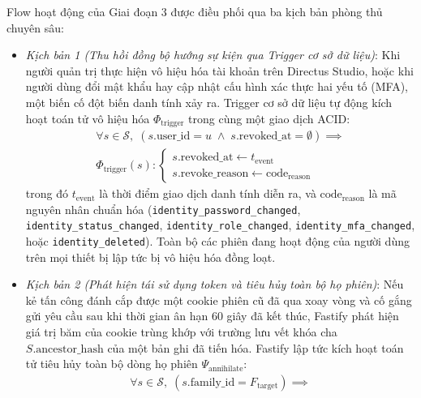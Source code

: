 Flow hoạt động của Giai đoạn 3 được điều phối qua ba kịch bản phòng thủ chuyên sâu:
\begin{itemize}
    \item[-] \textit{Kịch bản 1 (Thu hồi đồng bộ hướng sự kiện qua Trigger cơ sở dữ liệu)}: Khi người quản trị thực hiện vô hiệu hóa tài khoản trên Directus Studio, hoặc khi người dùng đổi mật khẩu hay cập nhật cấu hình xác thực hai yếu tố (MFA), một biến cố đột biến danh tính xảy ra. Trigger cơ sở dữ liệu tự động kích hoạt toán tử vô hiệu hóa $\Phi_{\text{trigger}}$ trong cùng một giao dịch ACID:
    \begin{equation}
    \label{eq:trigger_revoke_vi}
    \begin{aligned}
    \forall s \in \mathcal{S}, \; (s.\text{user\_id} = u \;\wedge\; s.\text{revoked\_at} = \emptyset) \implies \\
    \Phi_{\text{trigger}}(s) : \begin{cases}
    s.\text{revoked\_at} \leftarrow t_{\text{event}} \\
    s.\text{revoke\_reason} \leftarrow \text{code}_{\text{reason}}
    \end{cases}
    \end{aligned}
    \end{equation}
    trong đó $t_{\text{event}}$ là thời điểm giao dịch danh tính diễn ra, và $\text{code}_{\text{reason}}$ là mã nguyên nhân chuẩn hóa (\texttt{identity\_}\allowbreak\texttt{password\_}\allowbreak\texttt{changed}, \texttt{identity\_}\allowbreak\texttt{status\_}\allowbreak\texttt{changed}, \texttt{identity\_}\allowbreak\texttt{role\_}\allowbreak\texttt{changed}, \texttt{identity\_}\allowbreak\texttt{mfa\_}\allowbreak\texttt{changed}, hoặc \texttt{identity\_}\allowbreak\texttt{deleted}). Toàn bộ các phiên đang hoạt động của người dùng trên mọi thiết bị lập tức bị vô hiệu hóa đồng loạt.
    \item[-] \textit{Kịch bản 2 (Phát hiện tái sử dụng token và tiêu hủy toàn bộ họ phiên)}: Nếu kẻ tấn công đánh cắp được một cookie phiên cũ đã qua xoay vòng và cố gắng gửi yêu cầu sau khi thời gian ân hạn 60 giây đã kết thúc, Fastify phát hiện giá trị băm của cookie trùng khớp với trường lưu vết khóa cha $S.\text{ancestor\_hash}$ của một bản ghi đã tiến hóa. Fastify lập tức kích hoạt toán tử tiêu hủy toàn bộ dòng họ phiên $\Psi_{\text{annihilate}}$:
    \begin{equation}
    \label{eq:family_revoke_vi}
    \begin{aligned}
    \forall s \in \mathcal{S}, \; (s.\text{family\_id} = F_{\text{target}}) \implies \\

\end{aligned}
\end{equation}
\end{itemize}

